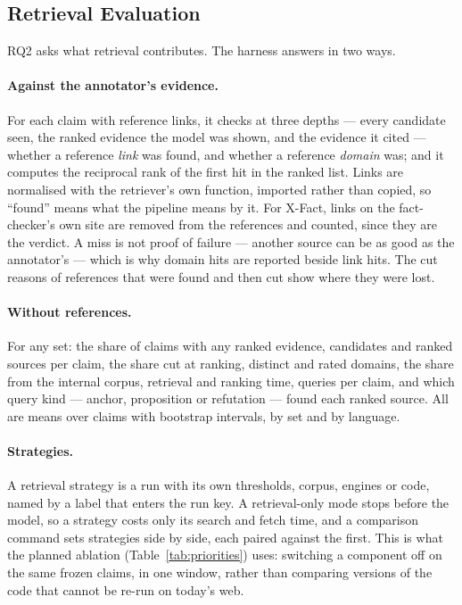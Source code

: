 
\subsection{Retrieval Evaluation}
\label{subsec:harness-retrieval}

RQ2 asks what retrieval contributes. The harness answers in two ways.

\paragraph{Against the annotator's evidence.} For each claim with
reference links, it checks at three depths --- every candidate seen,
the ranked evidence the model was shown, and the evidence it cited ---
whether a reference \emph{link} was found, and whether a reference
\emph{domain} was; and it computes the reciprocal rank of the first hit
in the ranked list. Links are normalised with the retriever's own
function, imported rather than copied, so ``found'' means what the
pipeline means by it. For X-Fact, links on the fact-checker's own site
are removed from the references and counted, since they are the
verdict. A miss is not proof of failure --- another source can be as
good as the annotator's --- which is why domain hits are reported beside
link hits. The cut reasons of references that were found and then cut
show where they were lost.

\paragraph{Without references.} For any set: the share of claims with
any ranked evidence, candidates and ranked sources per claim, the share
cut at ranking, distinct and rated domains, the share from the internal
corpus, retrieval and ranking time, queries per claim, and which query
kind --- anchor, proposition or refutation --- found each ranked
source. All are means over claims with bootstrap intervals, by set and
by language.

\paragraph{Strategies.} A retrieval strategy is a run with its own
thresholds, corpus, engines or code, named by a label that enters the
run key. A retrieval-only mode stops before the model, so a strategy
costs only its search and fetch time, and a comparison command sets
strategies side by side, each paired against the first. This is what
the planned ablation (Table~\ref{tab:priorities}) uses: switching a
component off on the same frozen claims, in one window, rather than
comparing versions of the code that cannot be re-run on today's web.

